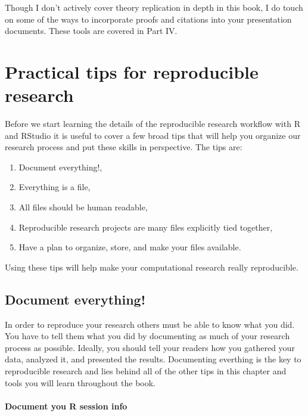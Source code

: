 {Though I don't actively cover theory replication in depth in this book, I do touch on some of the ways to incorporate proofs and citations into your presentation documents. These tools are covered in Part IV.

\section{Practical tips for reproducible research}

Before we start learning the details of the reproducible research workflow with R and RStudio it is useful to cover a few broad tips that will help you organize our research process and put these skills in perspective. The tips are:

\begin{enumerate}
    \item Document everything!,
    \item Everything is a file,
    \item All files should be human readable,
    \item Reproducible research projects are many files explicitly tied together,
    \item Have a plan to organize, store, and make your files available.    
\end{enumerate}

\noindent Using these tips will help make your computational research really reproducible.

\subsection{Document everything!}

In order to reproduce your research others must be able to know what you did. You have to tell them what you did by documenting as much of your research process as possible. Ideally, you should tell your readers how you gathered your data, analyzed it, and presented the results. Documenting everthing is the key to reproducible research and lies behind all of the other tips in this chapter and tools you will learn throughout the book.

\paragraph{Document you R session info}

}
